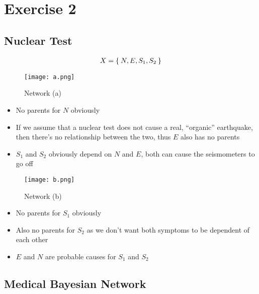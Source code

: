 \documentclass[fleqn,12pt]{scrartcl}
\newcommand{\blattn}{Exercise 2}
\begin{document}
\section*{\blattn}
\setcounter{section}{2}

\subsection{Nuclear Test}
		\begin{align*}
			X = \Set{N, E, S_1, S_2}\\
		\end{align*}
\begin{figure}[h]
	\centering
  \texttt{[image: a.png]}
	\caption{Network (a)}
	\label{fig1}
\end{figure}

\begin{itemize}
	\item
		No parents for $N$ obviously
	\item
		If we assume that a nuclear test does not cause a real, \enquote{organic} earthquake, then there's no relationship between the two, thus $E$ also has no parents
	\item
		$S_1$ and $S_2$ obviously depend on $N$ and $E$, both can cause the seismometers to go off
\end{itemize}
\begin{figure}[h]
	\centering
  \texttt{[image: b.png]}
	\caption{Network (b)}
	\label{fig2}
\end{figure}
\begin{itemize}
	\item
		No parents for $S_1$ obviously
	\item
		Also no parents for $S_2$ as we don't want both symptoms to be dependent of each other
	\item
		$E$ and $N$ are probable causes for $S_1$ and $S_2$
\end{itemize}

\subsection{Medical Bayesian Network}


\end{document}
